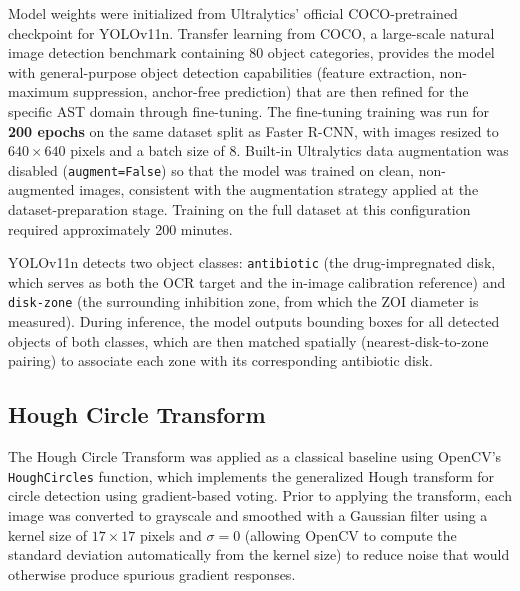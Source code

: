 Model weights were initialized from Ultralytics' official COCO-pretrained checkpoint for
YOLOv11n. Transfer learning from COCO, a large-scale natural image detection benchmark
containing 80 object categories, provides the model with general-purpose object detection
capabilities (feature extraction, non-maximum suppression, anchor-free prediction) that
are then refined for the specific AST domain through fine-tuning. The fine-tuning training
was run for \textbf{200 epochs} on the same dataset split as Faster R-CNN, with images
resized to $640 \times 640$ pixels and a batch size of 8. Built-in Ultralytics data
augmentation was disabled (\texttt{augment=False}) so that the model was trained on
clean, non-augmented images, consistent with the augmentation strategy applied at the
dataset-preparation stage. Training on the full dataset at this configuration required
approximately 200 minutes.

YOLOv11n detects two object classes: \texttt{antibiotic} (the drug-impregnated disk, which
serves as both the OCR target and the in-image calibration reference) and \texttt{disk-zone}
(the surrounding inhibition zone, from which the ZOI diameter is measured). During inference,
the model outputs bounding boxes for all detected objects of both classes, which are then
matched spatially (nearest-disk-to-zone pairing) to associate each zone with its
corresponding antibiotic disk.

\subsection{Hough Circle Transform}

The Hough Circle Transform was applied as a classical baseline using OpenCV's
\texttt{HoughCircles} function, which implements the generalized Hough transform for circle
detection using gradient-based voting. Prior to applying the transform, each image was
converted to grayscale and smoothed with a Gaussian filter using a kernel size of
$17 \times 17$ pixels and $\sigma = 0$ (allowing OpenCV to compute the standard deviation
automatically from the kernel size) to reduce noise that would otherwise produce spurious
gradient responses.

